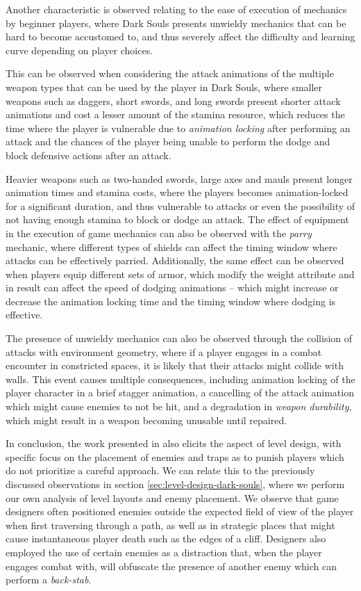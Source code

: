 Another characteristic is observed relating to the ease of execution of mechanics by beginner players, where Dark Souls presents unwieldy mechanics that can be hard to become accustomed to, and thus severely affect the difficulty and learning curve depending on player choices.

This can be observed when considering the attack animations of the multiple weapon types that can be used by the player in Dark Souls, where smaller weapons such as daggers, short swords, and long swords present shorter attack animations and cost a lesser amount of the stamina resource, which reduces the time where the player is vulnerable due to \emph{animation locking} after performing an attack and the chances of the player being unable to perform the dodge and block defensive actions after an attack.

Heavier weapons such as two-handed swords, large axes and mauls present longer animation times and stamina costs, where the players becomes animation-locked for a significant duration, and thus vulnerable to attacks or even the possibility of not having enough stamina to block or dodge an attack. The effect of equipment in the execution of game mechanics can also be observed with the \emph{parry} mechanic, where different types of shields can affect the timing window where attacks can be effectively parried. Additionally, the same effect can be observed when players equip different sets of armor, which modify the weight attribute and in result can affect the speed of dodging animations -- which might increase or decrease the animation locking time and the timing window where dodging is effective.

The presence of unwieldy mechanics can also be observed through the collision of attacks with environment geometry, where if a player engages in a combat encounter in constricted spaces, it is likely that their attacks might collide with walls. This event causes multiple consequences, including animation locking of the player character in a brief stagger animation, a cancelling of the attack animation which might cause enemies to not be hit, and a degradation in \emph{weapon durability}, which might result in a weapon becoming unusable until repaired.

In conclusion, the work presented in \cite{YT_DarkSoulsSimpleAI} also elicits the aspect of level design, with specific focus on the placement of enemies and traps as to punish players which do not prioritize a careful approach. We can relate this to the previously discussed observations in section \ref{sec:level-design-dark-souls}, where we perform our own analysis of level layouts and enemy placement. We observe that game designers often positioned enemies outside the expected field of view of the player when first traversing through a path, as well as in strategic places that might cause instantaneous player death such as the edges of a cliff. Designers also employed the use of certain enemies as a distraction that, when the player engages combat with, will obfuscate the presence of another enemy which can perform a \emph{back-stab}.

